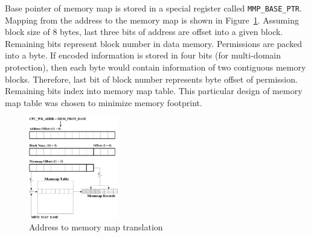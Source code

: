 %
Base pointer of memory map is stored in a special register called \texttt{MMP\_BASE\_PTR}.
%
Mapping from the address to the memory map is shown in Figure~\ref{fig:addr_memmap_translate}.
%
Assuming block size of 8 bytes, last three bits of address are offset into a given block.
%
Remaining bits represent block number in data memory.
%
Permissions are packed into a byte.
%
If encoded information is stored in four bits (for multi-domain protection), then each byte would contain information of two contiguous memory blocks.
%
Therefore, last bit of block number represents byte offset of permission.
%
Remaining bits index into memory map table.
%
This particular design of memory map table was chosen to minimize memory footprint.
%
%
%
\begin{figure}[htbp]
   \centering
   \includegraphics[height=1.75in, keepaspectratio=true]{figures/memaddrtrans.pdf} 
   \caption{Address to memory map translation}
   \label{fig:addr_memmap_translate}
\end{figure}
%
%
%
%
%
%

